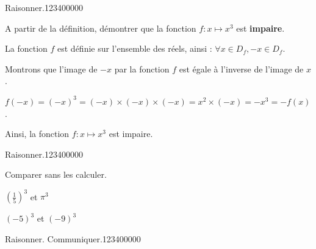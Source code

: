 \begin{pageAD}  %
\restoregeometry %
 

\begin{ExoCad}{Raisonner.}{1234}{0}{0}{0}{0}{0}

A partir de la définition, démontrer que la fonction $f:x\mapsto x^3$ est \textbf{impaire}.


La fonction $f$ est définie sur l'ensemble des réels, ainsi : $\forall x\in D_f,-x\in D_f$.

Montrons que l'image de $-x$ par la fonction $f$ est égale à l'inverse de l'image de $x$.

$f(-x)=(-x)^3=(-x)\times(-x)\times(-x)=x^2\times(-x)=-x^3=-f(x)$.

Ainsi, la fonction $f :x\mapsto x^3$ est impaire.

\end{ExoCad} 

\begin{ExoCad}{Raisonner.}{1234}{0}{0}{0}{0}{0}

Comparer sans les calculer.

\begin{description}[leftmargin=*]
\item $\left(\frac{1}{5}\right)^3$ et $\pi^3$  

%


\item $(-5)^3$ et $(-9)^3$

%

\end{description}

\end{ExoCad} 


\begin{ExoCad}{Raisonner. Communiquer.}{1234}{0}{0}{0}{0}{0}


\end{ExoCad}
\end{pageAD}
